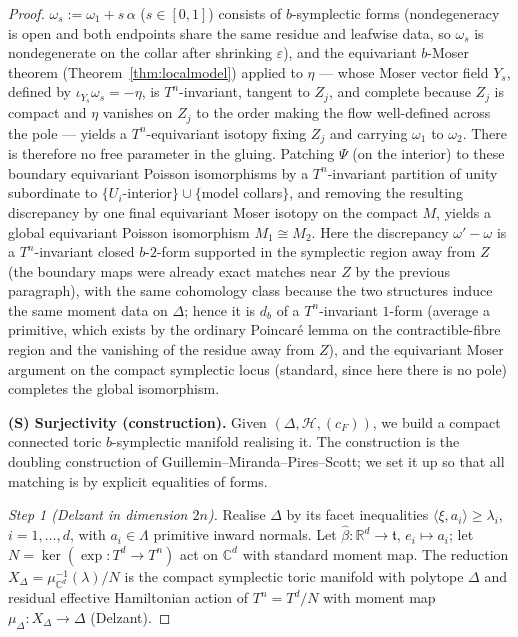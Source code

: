 \documentclass{amsart}
\theoremstyle{definition}
\begin{document}
\begin{proof}
$\omega_s:=\omega_1+s\,\alpha$ ($s\in[0,1]$) consists of $b$-symplectic forms
(nondegeneracy is open and both endpoints share the same residue and leafwise
data, so $\omega_s$ is nondegenerate on the collar after shrinking
$\varepsilon$), and the equivariant $b$-Moser theorem
(Theorem~\ref{thm:localmodel}) applied to $\eta$ — whose Moser vector field
$Y_s$, defined by $\iota_{Y_s}\omega_s=-\eta$, is $T^n$-invariant, tangent to
$Z_j$, and complete because $Z_j$ is compact and $\eta$ vanishes on $Z_j$ to the
order making the flow well-defined across the pole — yields a $T^n$-equivariant
isotopy fixing $Z_j$ and carrying $\omega_1$ to $\omega_2$. There is therefore no
free parameter in the gluing. Patching $\Psi$ (on the interior) to these
boundary equivariant Poisson isomorphisms by a $T^n$-invariant partition of
unity subordinate to $\{U_i$-interior$\}\cup\{$model collars$\}$, and removing
the resulting discrepancy by one final equivariant Moser isotopy on the compact
$M$, yields a global equivariant Poisson isomorphism $M_1\cong M_2$. Here the
discrepancy $\omega'-\omega$ is a $T^n$-invariant closed $b$-$2$-form supported
in the symplectic region away from $Z$ (the boundary maps were already exact
matches near $Z$ by the previous paragraph), with the same cohomology class
because the two structures induce the same moment data on $\Delta$; hence it is
$d_b$ of a $T^n$-invariant $1$-form (average a primitive, which exists by the
ordinary Poincar\'e lemma on the contractible-fibre region and the vanishing of
the residue away from $Z$), and the equivariant Moser argument on the compact
symplectic locus (standard, since here there is no pole) completes the global
isomorphism.

\medskip
\noindent\textbf{(S) Surjectivity (construction).}
Given $(\Delta,\mathcal H,(c_F))$, we build a compact connected toric
$b$-symplectic manifold realising it. The construction is the doubling
construction of Guillemin--Miranda--Pires--Scott; we set it up so that all
matching is by explicit equalities of forms.

\emph{Step 1 (Delzant in dimension $2n$).} Realise $\Delta$ by its facet
inequalities $\langle\xi,a_i\rangle\ge\lambda_i$, $i=1,\dots,d$, with
$a_i\in\Lambda$ primitive inward normals. Let $\hat\beta\colon\mathbb R^d\to
\mathfrak t$, $e_i\mapsto a_i$; let $N=\ker(\exp\colon T^d\to T^n)$ act on
$\mathbb C^d$ with standard moment map. The reduction
$X_\Delta=\mu_{\mathbb C^d}^{-1}(\lambda)/N$ is the compact symplectic toric
manifold with polytope $\Delta$ and residual effective Hamiltonian action of
$T^n=T^d/N$ with moment map $\mu_\Delta\colon X_\Delta\to\Delta$ (Delzant).


\end{proof}
\end{document}
